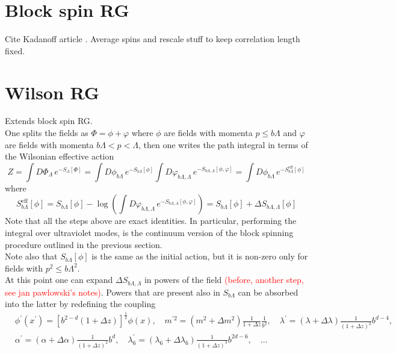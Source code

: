 \newpage


\section{Block spin RG}
\label{sec:blockspin}
Cite Kadanoff article \cite{PhysicsPhysiqueFizika.2.263}. Average spins and rescale stuff to keep correlation length fixed.

\section{Wilson RG}
\label{sec:wilson_rg}
Extends block spin RG. \\
One splits the fields as $\Phi = \phi + \varphi$ where $\phi$ are fields with momenta $p \leq b\Lambda$ and $\varphi$ are fields with momenta $b\Lambda < p < \Lambda$, then one writes the path integral in terms of the Wilsonian effective action
\begin{equation*}
    Z = \int D\Phi_\Lambda \, e^{-S_\Lambda[\Phi]} = \int D\phi_{b\Lambda} \, e^{-S_{b\Lambda}[\phi]} \int D\varphi_{b\Lambda, \Lambda}  \, e^{-S_{b\Lambda, \Lambda}[\phi, \varphi]} = \int D\phi_{b\Lambda} \, e^{-S_{b\Lambda}^\text{eff}[\phi]}
\end{equation*}
where 
\begin{equation*}
    S_{b\Lambda}^\text{eff}[\phi] = S_{b\Lambda}[\phi] - \log\left( \int D\varphi_{b\Lambda, \Lambda}  \, e^{-S_{b\Lambda, \Lambda}[\phi, \varphi]}\right) =  S_{b\Lambda}[\phi] + \Delta S_{b\Lambda, \Lambda}[\phi]
\end{equation*}
Note that all the steps above are exact identities. In particular, performing the integral over ultraviolet modes, is the continuum version of the block spinning procedure outlined in the previous section. \\
Note also that $S_{b\Lambda}[\phi]$ is the same as the initial action, but it is non-zero only for fields with $p^2 \leq b\Lambda^2$. \\
At this point one can expand $\Delta S_{b\Lambda, \Lambda}$ in powers of the field \textcolor{red}{(before, another step, see jan pawlowski's notes)}. Powers that are present also in $S_{b\Lambda}$ can be absorbed into the latter by redefining the coupling
\begin{equation}
\begin{aligned}
& \phi^{\prime}\left(x^{\prime}\right)=\left[b^{2-d}(1+\Delta z)\right]^{\frac{1}{2}} \phi(x), \quad m^{\prime 2}=\left(m^2+\Delta m^2\right) \frac{1}{1+\Delta z} \frac{1}{b^2}, \quad \lambda^{\prime}=(\lambda+\Delta \lambda) \frac{1}{(1+\Delta z)^2} b^{d-4}, \\
& \alpha^{\prime}=(\alpha+\Delta \alpha) \frac{1}{(1+\Delta z)^2} b^d, \quad \lambda_6^{\prime}=\left(\lambda_6+\Delta \lambda_6\right) \frac{1}{(1+\Delta z)^3} b^{2 d-6}, \quad \ldots \\
&
\end{aligned}
\end{equation}
